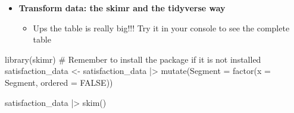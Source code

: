 \documentclass[
  ignorenonframetext,
]{beamer}
\newenvironment{Shaded}{\begin{snugshade}}{\end{snugshade}}
\newcommand{\AttributeTok}[1]{\textcolor[rgb]{0.40,0.45,0.13}{#1}}
\newcommand{\CommentTok}[1]{\textcolor[rgb]{0.37,0.37,0.37}{#1}}
\newcommand{\ConstantTok}[1]{\textcolor[rgb]{0.56,0.35,0.01}{#1}}
\newcommand{\FunctionTok}[1]{\textcolor[rgb]{0.28,0.35,0.67}{#1}}
\newcommand{\NormalTok}[1]{\textcolor[rgb]{0.00,0.23,0.31}{#1}}
\newcommand{\OtherTok}[1]{\textcolor[rgb]{0.00,0.23,0.31}{#1}}
\newcommand{\SpecialCharTok}[1]{\textcolor[rgb]{0.37,0.37,0.37}{#1}}
\providecommand{\tightlist}{%
  \setlength{\itemsep}{0pt}\setlength{\parskip}{0pt}}\usepackage{longtable,booktabs,array}
\begin{document}
\begin{frame}[fragile]{}
\label{section-6}
\begin{itemize}
\item
  \textbf{Transform data: the skimr and the tidyverse way}

  \begin{itemize}
  \tightlist
  \item
    Ups the table is really big!!! Try it in your console to see the
    complete table
  \end{itemize}
\end{itemize}

\tiny

\begin{Shaded}
\begin{Highlighting}[]
\FunctionTok{library}\NormalTok{(skimr) }\CommentTok{\# Remember to install the package if it is not installed}
\NormalTok{satisfaction\_data }\OtherTok{\textless{}{-}}\NormalTok{ satisfaction\_data }\SpecialCharTok{|\textgreater{}}
  \FunctionTok{mutate}\NormalTok{(}\AttributeTok{Segment =} \FunctionTok{factor}\NormalTok{(}\AttributeTok{x =}\NormalTok{ Segment, }\AttributeTok{ordered =} \ConstantTok{FALSE}\NormalTok{))}
\end{Highlighting}
\end{Shaded}

\begin{Shaded}
\begin{Highlighting}[]
\NormalTok{satisfaction\_data }\SpecialCharTok{|\textgreater{}} \FunctionTok{skim}\NormalTok{()}
\end{Highlighting}
\end{Shaded}
\end{frame}
\end{document}
